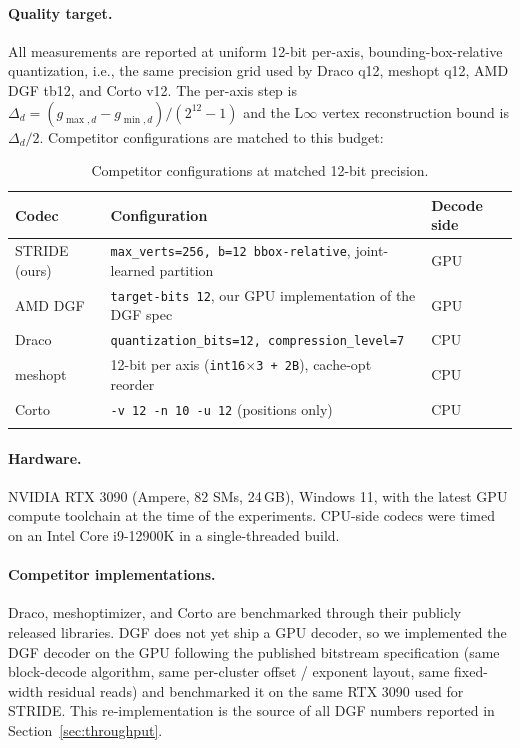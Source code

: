 \documentclass[pdflatex,sn-vancouver-num]{sn-jnl}%
\theoremstyle{thmstyleone}%
\theoremstyle{thmstyletwo}%
\theoremstyle{thmstylethree}%
\begin{document}
\paragraph{Quality target.}
All measurements are reported at uniform 12-bit per-axis, bounding-box-relative quantization, i.e., the same precision grid used by Draco q12, meshopt q12, AMD DGF tb12, and Corto v12. The per-axis step is $\Delta_d = (g_{\max,d} - g_{\min,d}) / (2^{12}-1)$ and the L$\infty$ vertex reconstruction bound is $\Delta_d / 2$. Competitor configurations are matched to this budget:

\begin{table}[ht]
\caption{Competitor configurations at matched 12-bit precision.}\label{tab:configs}
\begin{tabular*}{\textwidth}{@{\extracolsep\fill}lll@{}}
\toprule
Codec & Configuration & Decode side \\
\midrule
STRIDE (ours) & \texttt{max\_verts=256, b=12 bbox-relative}, joint-learned partition & GPU \\
AMD DGF       & \texttt{target-bits 12}, our GPU implementation of the DGF spec       & GPU \\
Draco         & \texttt{quantization\_bits=12, compression\_level=7}                  & CPU \\
meshopt       & 12-bit per axis (\texttt{int16$\times$3 + 2B}), cache-opt reorder    & CPU \\
Corto         & \texttt{-v 12 -n 10 -u 12} (positions only)                           & CPU \\
\botrule
\end{tabular*}
\end{table}

\paragraph{Hardware.}
NVIDIA RTX 3090 (Ampere, 82 SMs, 24\,GB), Windows 11, with the latest GPU compute toolchain at the time of the experiments. CPU-side codecs were timed on an Intel Core i9-12900K in a single-threaded build.

\paragraph{Competitor implementations.}
Draco, meshoptimizer, and Corto are benchmarked through their publicly released libraries. DGF does not yet ship a GPU decoder, so we implemented the DGF decoder on the GPU following the published bitstream specification (same block-decode algorithm, same per-cluster offset / exponent layout, same fixed-width residual reads) and benchmarked it on the same RTX 3090 used for STRIDE. This re-implementation is the source of all DGF numbers reported in Section~\ref{sec:throughput}.
\end{document}
